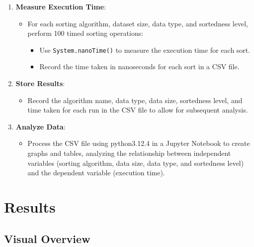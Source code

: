 \documentclass[unicode,11pt,a4paper,oneside,numbers=endperiod,openany]{scrartcl}
\begin{document}
\begin{enumerate}
        \item \textbf{Measure Execution Time}:
        \begin{itemize}
            \item For each sorting algorithm, dataset size, data type, and sortedness level, perform 100 timed sorting operations:
            \begin{itemize}
                \item Use \texttt{System.nanoTime()} to measure the execution time for each sort.
                \item Record the time taken in nanoseconds for each sort in a CSV file.
            \end{itemize}
        \end{itemize}
    
        \item \textbf{Store Results}:
        \begin{itemize}
            \item Record the algorithm name, data type, data size, sortedness level, and time taken for each run in the CSV file to allow for subsequent analysis.
        \end{itemize}
    
        \item \textbf{Analyze Data}:
        \begin{itemize}
            \item Process the CSV file using python3.12.4 in a Jupyter Notebook to create graphs and tables, analyzing the relationship between independent variables (sorting algorithm, data size, data type, and sortedness level) and the dependent variable (execution time).
        \end{itemize}
    \end{enumerate}


\section{Results}

    \subsection{Visual Overview}
\end{document}
